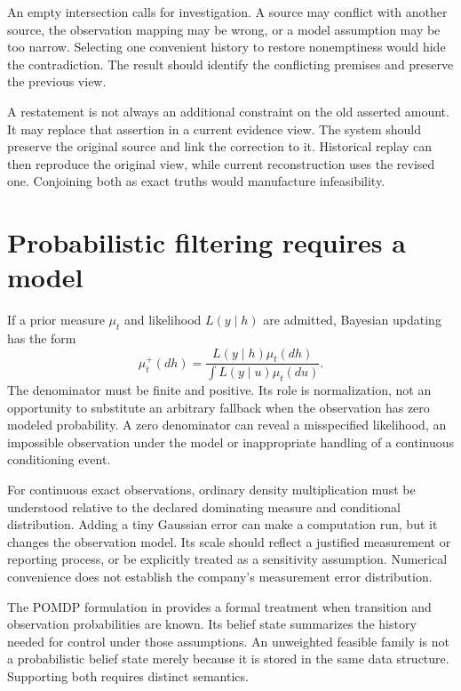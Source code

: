 An empty intersection calls for investigation. A source may conflict with another source, the observation mapping may be wrong, or a model assumption may be too narrow. Selecting one convenient history to restore nonemptiness would hide the contradiction. The result should identify the conflicting premises and preserve the previous view.

A restatement is not always an additional constraint on the old asserted amount. It may replace that assertion in a current evidence view. The system should preserve the original source and link the correction to it. Historical replay can then reproduce the original view, while current reconstruction uses the revised one. Conjoining both as exact truths would manufacture infeasibility.

\section{Probabilistic filtering requires a model}
If a prior measure $\mu_t$ and likelihood $L(y\mid h)$ are admitted, Bayesian updating has the form
\begin{equation}
 \mu_t^+(dh)=\frac{L(y\mid h)\mu_t(dh)}{\int L(y\mid u)\mu_t(du)}.
 \label{sim:bayes-update}
\end{equation}
The denominator must be finite and positive. Its role is normalization, not an opportunity to substitute an arbitrary fallback when the observation has zero modeled probability. A zero denominator can reveal a misspecified likelihood, an impossible observation under the model or inappropriate handling of a continuous conditioning event.

For continuous exact observations, ordinary density multiplication must be understood relative to the declared dominating measure and conditional distribution. Adding a tiny Gaussian error can make a computation run, but it changes the observation model. Its scale should reflect a justified measurement or reporting process, or be explicitly treated as a sensitivity assumption. Numerical convenience does not establish the company's measurement error distribution.

The POMDP formulation in \citet[Sections 3.1--3.4]{kaelbling1998} provides a formal treatment when transition and observation probabilities are known. Its belief state summarizes the history needed for control under those assumptions. An unweighted feasible family is not a probabilistic belief state merely because it is stored in the same data structure. Supporting both requires distinct semantics.

